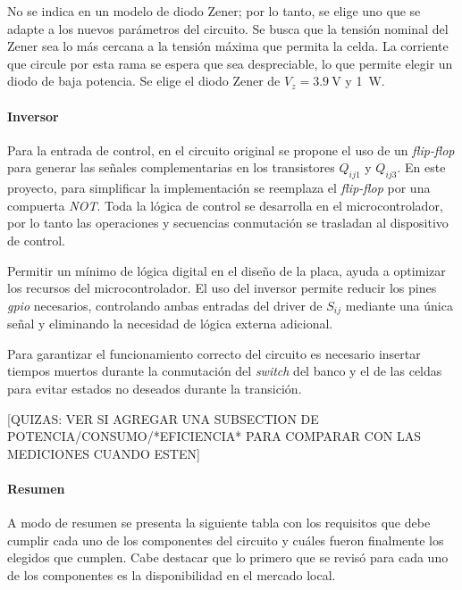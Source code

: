 No se indica en \cite{kim2012self} un modelo de diodo Zener; por lo tanto, se elige uno que se adapte a los nuevos parámetros del circuito. Se busca que la tensión nominal del Zener sea lo más cercana a la tensión máxima que permita la celda. La corriente que circule por esta rama se espera que sea despreciable, lo que permite elegir un diodo de baja potencia. Se elige el diodo Zener de $V_z = \SI{3.9}{\volt}$ y \SI{1}{\watt}. 



\paragraph{Inversor}

Para la entrada de control, en el circuito original se propone el uso de un \textit{flip-flop} para generar las señales complementarias en los transistores $Q_{ij1}$ y $Q_{ij3}$. En este proyecto, para simplificar la implementación se reemplaza el \textit{flip-flop} por una compuerta \textit{NOT}. Toda la lógica de control se desarrolla en el microcontrolador, por lo tanto las operaciones y secuencias conmutación se trasladan al dispositivo de control. 

Permitir un mínimo de lógica digital en el diseño de la placa, ayuda a optimizar los recursos del microcontrolador. El uso del inversor permite reducir los pines \textit{gpio} necesarios, controlando ambas entradas del driver de $S_{ij}$ mediante una única señal y eliminando la necesidad de lógica externa adicional.

Para garantizar el funcionamiento correcto del circuito es necesario insertar tiempos muertos durante la conmutación del \textit{switch} del banco y el de las celdas para evitar estados no deseados durante la transición.


[QUIZAS: VER SI AGREGAR UNA SUBSECTION DE POTENCIA/CONSUMO/*EFICIENCIA* PARA COMPARAR CON LAS MEDICIONES CUANDO ESTEN]

\paragraph{Resumen}


A modo de resumen se presenta la siguiente tabla con los requisitos que debe cumplir cada uno de los componentes del circuito y cuáles fueron finalmente los elegidos que cumplen. Cabe destacar que lo primero que se revisó para cada uno de los componentes es la disponibilidad en el mercado local.


